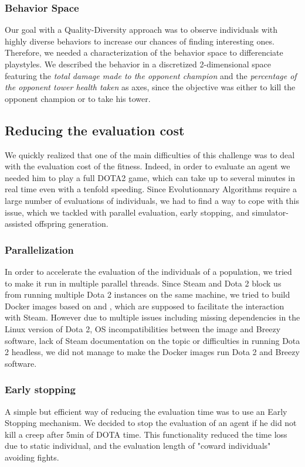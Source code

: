 \subsubsection{Behavior Space}
Our goal with a Quality-Diversity approach was to observe individuals with highly diverse behaviors to increase our chances of finding interesting ones. Therefore, we needed a characterization of the behavior space to differenciate playstyles. 
We described the behavior in a discretized 2-dimensional space featuring the \textit{total damage made to the opponent champion} and the \textit{percentage of the opponent tower health taken} as axes, since the objective was either to kill the opponent champion or to take his tower. 

\subsection{Reducing the evaluation cost}
We quickly realized that one of the main difficulties of this challenge was to deal with the evaluation cost of the fitness. Indeed, in order to evaluate an agent we needed him to play a full DOTA2 game, which can take up to several minutes in real time even with a tenfold speeding. Since Evolutionnary Algorithms require a large number of evaluations of individuals, we had to find a way to cope with this issue, which we tackled with parallel evaluation, early stopping, and simulator-assisted offspring generation.

\subsubsection{Parallelization}
In order to accelerate the evaluation of the individuals of a population, we tried to make it run in multiple parallel threads. Since Steam and Dota 2 block us from running multiple Dota 2 instances on the same machine, we tried to build Docker images based on  and , which are supposed to facilitate the interaction with Steam. However due to multiple issues including missing dependencies in the Linux version of Dota 2, OS incompatibilities between the image and Breezy software, lack of Steam documentation on the topic or difficulties in running Dota 2 headless, we did not manage to make the Docker images run Dota 2 and Breezy software.

\subsubsection{Early stopping}
\label{sub:early-stop}
A simple but efficient way of reducing the evaluation time was to use an Early Stopping mechanism. We decided to stop the evaluation of an agent if he did not kill a creep after 5min of DOTA time. This functionality reduced the time loss due to static individual, and the evaluation length of "coward individuals" avoiding fights.

